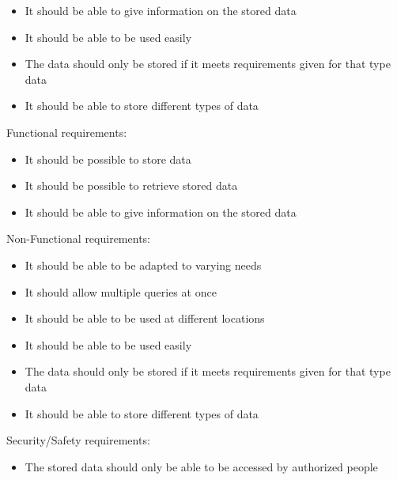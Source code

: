 \begin{elenco}
\begin{itemize}
    \item It should be able to give information on the stored data
    \item It should be able to be used easily
    \item The data should only be stored if it meets requirements given for that type data
    \item It should be able to store different types of data
\end{itemize}
\item
Functional requirements:
\begin{itemize}
    \item It should be possible to store data
    \item It should be possible to retrieve stored data
    \item It should be able to give information on the stored data
\end{itemize} 
Non-Functional requirements:
\begin{itemize}
    \item It should be able to be adapted to varying needs
    \item It should allow multiple queries at once
    \item It should be able to be used at different locations
    \item It should be able to be used easily
    \item The data should only be stored if it meets requirements given for that type data
    \item It should be able to store different types of data
\end{itemize} 
Security/Safety requirements:
\begin{itemize}
    \item The stored data should only be able to be accessed by authorized people
\end{itemize} 
\end{elenco}